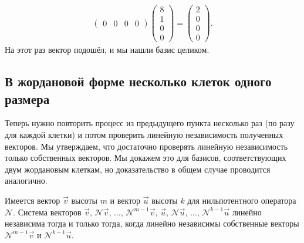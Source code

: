 \begin{solution}
\begin{gather*}
\begin{pmatrix}
			0 & 0 & 0 & 0
		\end{pmatrix}
		\begin{pmatrix}
			8\\
			1\\
			0\\
			0
		\end{pmatrix} =
		\begin{pmatrix}
			2\\
			0\\
			0\\
			0
		\end{pmatrix}.
	\end{gather*}
	На этот раз\footnotemark{} вектор подошёл, и мы нашли базис целиком.
\end{solution}


\subsection{В жордановой форме несколько клеток одного размера}

Теперь нужно повторить процесс из предыдущего пункта несколько раз (по разу для каждой клетки) и потом проверить линейную независимость полученных векторов. Мы утверждаем, что достаточно проверять линейную независимость только собственных векторов. Мы докажем это для базисов, соответствующих двум жордановым клеткам, но доказательство в общем случае проводится аналогично.

\begin{lemma}
	Имеется вектор $\vec{v}$ высоты $m$ и вектор $\vec{u}$ высоты $k$ для нильпотентного оператора $\mathcal{N}$. Система векторов $\vec{v},\,\mathcal{N}\vec{v},\,\ldots,\,\mathcal{N}^{m - 1}\vec{v},\,\vec{u},\,\mathcal{N}\vec{u},\,\ldots,\,\mathcal{N}^{k - 1}\vec{u}$ линейно независима тогда и только тогда, когда линейно независимы собственные векторы $\mathcal{N}^{m - 1}\vec{v}$ и $\mathcal{N}^{k - 1}\vec{u}$.
\end{lemma}

